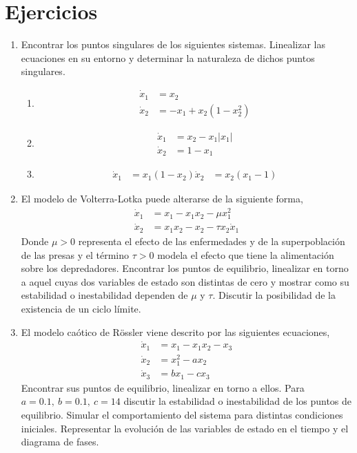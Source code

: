 \section*{Ejercicios}
\begin{enumerate}
\item Encontrar los puntos singulares de los siguientes sistemas. Linealizar las ecuaciones en su entorno y determinar la naturaleza de dichos puntos singulares.
\begin{enumerate}
\item \begin{align*}
\dot x_1 &= x_2\\
\dot x_2 &= -x_1 + x_2(1 - x_2^2)
\end{align*}
\item \begin{align*}
\dot x_1 &= x_2 - x_1\vert x_1\vert \\
\dot x_2 &= 1 - x_1
\end{align*}
\item \begin{align*}
\dot x_1 &= x_1(1-x_2)
\dot x_2 &= x_2(x_1-1)
\end{align*}
\end{enumerate}

\item El modelo de Volterra-Lotka puede alterarse de la siguiente forma,
\begin{align*}
\dot x_1 &= x_1 -x_1x_2 - \mu x_1^2\\
\dot x_2 &= x_1x_2 - x_2 -\tau x_2 \dot x_1
\end{align*}
Donde $\mu>0$ representa el efecto de las enfermedades y de la superpoblación de las presas y el término $\tau>0$ modela el efecto que tiene la alimentación sobre los depredadores. Encontrar los puntos de equilibrio, linealizar en torno a aquel cuyas dos variables de estado son distintas de cero y mostrar como su estabilidad o inestabilidad dependen de $\mu$ y $\tau$. Discutir la posibilidad de la existencia de un ciclo límite.
\item El modelo caótico de Rössler viene descrito por las siguientes ecuaciones,
\begin{align*}
\dot x_1 &= x_1 -x_1x_2 -x_3\\
\dot x_2 &= x_1^2-ax_2\\
\dot x_3 &= bx_1 -cx_3
\end{align*}
Encontrar sus puntos de equilibrio, linealizar en torno a ellos. Para $a=0.1,\ b=0.1,\ c= 14$ discutir la estabilidad o inestabilidad de los puntos de equilibrio. Simular el comportamiento del sistema para distintas condiciones iniciales. Representar la evolución de las variables de estado en el tiempo y el diagrama de fases. 


\end{enumerate}

